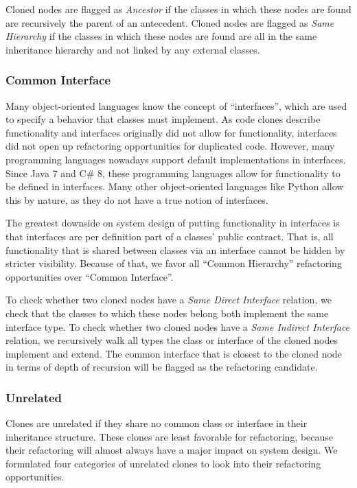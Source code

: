 Cloned nodes are flagged as \textit{Ancestor} if the classes in which these nodes are found are recursively the parent of an antecedent. Cloned nodes are flagged as \textit{Same Hierarchy} if the classes in which these nodes are found are all in the same inheritance hierarchy and not linked by any external classes.

\subsubsection{Common Interface}
Many object-oriented languages know the concept of ``interfaces'', which are used to specify a behavior that classes must implement. As code clones describe functionality and interfaces originally did not allow for functionality, interfaces did not open up refactoring opportunities for duplicated code. However, many programming languages nowadays support default implementations in interfaces. Since Java 7 and C\# 8, these programming languages allow for functionality to be defined in interfaces. Many other object-oriented languages like Python allow this by nature, as they do not have a true notion of interfaces.

The greatest downside on system design of putting functionality in interfaces is that interfaces are per definition part of a classes' public contract. That is, all functionality that is shared between classes via an interface cannot be hidden by stricter visibility. Because of that, we favor all ``Common Hierarchy'' refactoring opportunities over ``Common Interface''.

To check whether two cloned nodes have a \textit{Same Direct Interface} relation, we check that the classes to which these nodes belong both implement the same interface type. To check whether two cloned nodes have a \textit{Same Indirect Interface} relation, we recursively walk all types the class or interface of the cloned nodes implement and extend. The common interface that is closest to the cloned node in terms of depth of recursion will be flagged as the refactoring candidate.

\subsubsection{Unrelated}
Clones are unrelated if they share no common class or interface in their inheritance structure. These clones are least favorable for refactoring, because their refactoring will almost always have a major impact on system design. We formulated four categories of unrelated clones to look into their refactoring opportunities.


